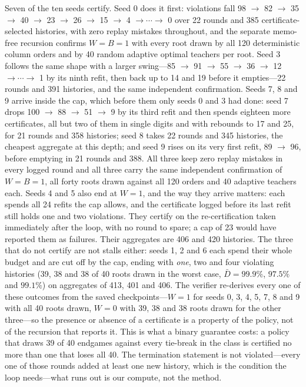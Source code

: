 \documentclass[conference]{IEEEtran}
\begin{document}
Seven of the ten seeds certify. Seed 0 does it first: violations fall 98 $\to$ 82 $\to$ 35 $\to$ 40 $\to$ 23 $\to$ 26 $\to$ 15 $\to$ 4 $\to\cdots\to$ 0 over 22 rounds and 385 certificate-selected histories, with zero replay mistakes throughout, and the separate memo-free recursion confirms $W=B=1$ with every root drawn by all 120 deterministic column orders and by 40 random adaptive optimal teachers per root. Seed 3 follows the same shape with a larger swing---85 $\to$ 91 $\to$ 55 $\to$ 36 $\to$ 12 $\to\cdots\to$ 1 by its ninth refit, then back up to 14 and 19 before it empties---22 rounds and 391 histories, and the same independent confirmation. Seeds 7, 8 and 9 arrive inside the cap, which before them only seeds 0 and 3 had done: seed 7 drops 100 $\to$ 88 $\to$ 51 $\to$ 9 by its third refit and then spends eighteen more certificates, all but two of them in single digits and with rebounds to 17 and 25, for 21 rounds and 358 histories; seed 8 takes 22 rounds and 345 histories, the cheapest aggregate at this depth; and seed 9 rises on its very first refit, 89 $\to$ 96, before emptying in 21 rounds and 388. All three keep zero replay mistakes in every logged round and all three carry the same independent confirmation of $W=B=1$, all forty roots drawn against all 120 orders and 40 adaptive teachers each. Seeds 4 and 5 also end at $W=1$, and the way they arrive matters: each spends all 24 refits the cap allows, and the certificate logged before its last refit still holds one and two violations. They certify on the re-certification taken immediately after the loop, with no round to spare; a cap of 23 would have reported them as failures. Their aggregates are 406 and 420 histories. The three that do not certify are not stalls either: seeds 1, 2 and 6 each spend their whole budget and are cut off by the cap, ending with \emph{one}, two and four violating histories (39, 38 and 38 of 40 roots drawn in the worst case, $\bar D=99.9\%$, $97.5\%$ and $99.1\%$) on aggregates of 413, 401 and 406. The verifier re-derives every one of these outcomes from the saved checkpoints---$W=1$ for seeds 0, 3, 4, 5, 7, 8 and 9 with all 40 roots drawn, $W=0$ with 39, 38 and 38 roots drawn for the other three---so the presence or absence of a certificate is a property of the policy, not of the recursion that reports it. This is what a binary guarantee costs: a policy that draws 39 of 40 endgames against every tie-break in the class is certified no more than one that loses all 40. The termination statement is not violated---every one of those rounds added at least one new history, which is the condition the loop needs---what runs out is our compute, not the method.
\end{document}
